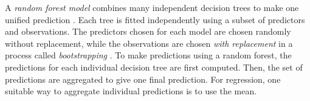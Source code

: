\documentclass{article}
\begin{document}
	

	
	A \textit{random forest model} combines many independent decision trees to make one unified prediction \cite{breiman2001random}. Each tree is fitted independently using a subset of predictors and observations. The predictors chosen for each model are chosen randomly without replacement, while the observations are chosen \textit{with replacement} in a process called \textit{bootstrapping} \cite{efron1994introduction}. To make predictions using a random forest, the predictions for each individual decision tree are first computed. Then, the set of predictions are aggregated to give one final prediction. For regression, one suitable way to aggregate individual predictions is to use the mean.
	
\end{document}
